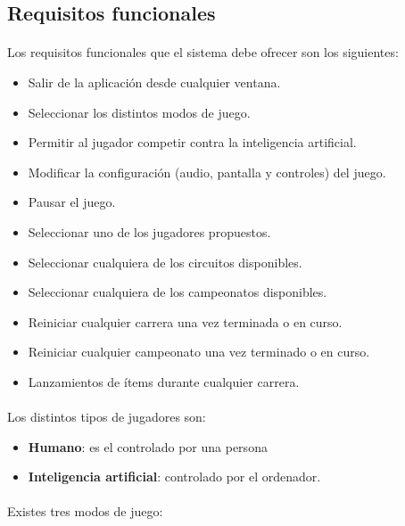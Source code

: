 \subsection{Requisitos funcionales}

\paragraph{}
Los requisitos funcionales que el sistema debe ofrecer son los siguientes:

\begin{itemize}
    \item Salir de la aplicación desde cualquier ventana.
    \item Seleccionar los distintos modos de juego.
    \item Permitir al jugador competir contra la inteligencia artificial.
    \item Modificar la configuración (audio, pantalla y controles) del juego.
    \item Pausar el juego.
    \item Seleccionar uno de los jugadores propuestos.
    \item Seleccionar cualquiera de los circuitos disponibles.
    \item Seleccionar cualquiera de los campeonatos disponibles.
    \item Reiniciar cualquier carrera una vez terminada o en curso.
    \item Reiniciar cualquier campeonato una vez terminado o en curso.
    \item Lanzamientos de ítems durante cualquier carrera.
\end{itemize}

\paragraph{}
Los distintos tipos de jugadores son:

\begin{itemize}
    \item \textbf{Humano}: es el controlado por una persona
    \item \textbf{Inteligencia artificial}: controlado por el ordenador.
\end{itemize}

\paragraph{}
Existes tres modos de juego:

